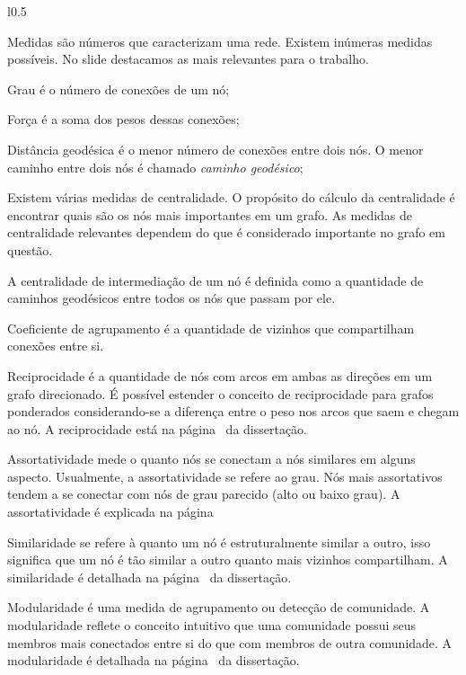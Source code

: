 \documentclass[10pt,a4paper,final]{article}
\begin{document}
\begin{minipage}[t]{\linewidth}
  \begin{wrapfigure}{l}{0.5\textwidth}
  \end{wrapfigure}
  
  Medidas são números que caracterizam uma rede. Existem inúmeras medidas possíveis. No slide destacamos as mais relevantes para o trabalho.
  
  Grau é o número de conexões de um nó;
  
  Força é a soma dos pesos dessas conexões;
  
  Distância geodésica é o menor número de conexões entre dois nós. O menor caminho entre dois nós é chamado \textit{caminho geodésico};
  
  Existem várias medidas de centralidade. O propósito do cálculo da centralidade é encontrar quais são os nós mais importantes em um grafo. As medidas de centralidade relevantes dependem do que é considerado importante no grafo em questão.
  
  A centralidade de intermediação de um nó é definida como a quantidade de caminhos geodésicos entre todos os nós que passam por ele.
  
  Coeficiente de agrupamento é a quantidade de vizinhos que compartilham conexões entre si.
  
  Reciprocidade é a quantidade de nós com arcos em ambas as direções em um grafo direcionado. É possível estender o conceito de reciprocidade para grafos ponderados considerando-se a diferença entre o peso nos arcos que saem e chegam ao nó. A reciprocidade está na página~\pageref{sec:reciprocidade} da dissertação.
  
  Assortatividade mede o quanto nós se conectam a nós similares em alguns aspecto. Usualmente, a assortatividade se refere ao grau. Nós mais assortativos tendem a se conectar com nós de grau parecido (alto ou baixo grau). A assortatividade é explicada na página~\pageref{sec:assortatividade}
  
  Similaridade se refere à quanto um nó é estruturalmente similar a outro, isso significa que um nó é tão similar a outro quanto mais vizinhos compartilham. A similaridade é detalhada na página~\pageref{sec:similaridade} da dissertação.
  
  Modularidade é uma medida de agrupamento ou detecção de comunidade. A modularidade reflete o conceito intuitivo que uma comunidade possui seus membros mais conectados entre si do que com membros de outra comunidade. A modularidade é detalhada na página~\pageref{sec:modularidade} da dissertação.
\end{minipage}
\end{document}
